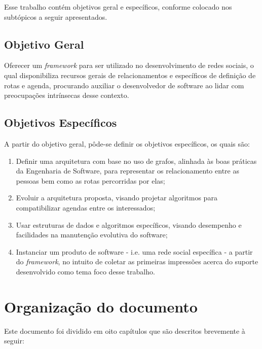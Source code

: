 Esse trabalho contém objetivos geral e específicos, conforme colocado nos subtópicos a seguir apresentados.

\subsection*{Objetivo Geral}

Oferecer um \textit{framework} para ser utilizado no desenvolvimento de redes sociais, o qual disponibiliza recursos gerais de relacionamentos e específicos de definição de rotas e agenda, procurando auxiliar o desenvolvedor de software ao lidar com preocupações intrínsecas desse contexto.

\subsection*{Objetivos Específicos}

A partir do objetivo geral, pôde-se definir os objetivos específicos, os quais são:

\begin{enumerate}
	\item Definir uma arquitetura com base no uso de grafos, alinhada às boas práticas da Engenharia de Software, para representar os relacionamento entre as pessoas bem como as rotas percorridas por elas;
	\item Evoluir a arquitetura proposta, visando projetar algoritmos para compatibilizar agendas entre os interessados;
	\item Usar estruturas de dados e algoritmos específicos, visando desempenho e facilidades na manutenção evolutiva do software;
	\item Instanciar um produto de software - i.e. uma rede social específica - a partir do \textit{framework}, no intuito de coletar as primeiras impressões acerca do suporte desenvolvido como tema foco desse trabalho.
\end{enumerate}

\section*{Organização do documento}

Este documento foi dividido em oito capítulos que são descritos brevemente à seguir:

